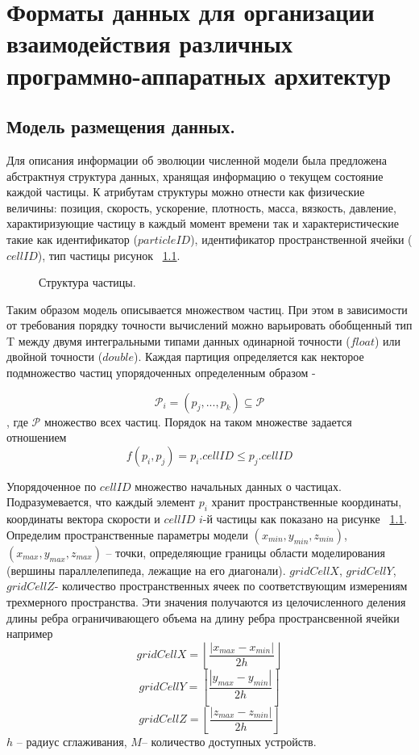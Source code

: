 \chapter{Форматы данных для организации взаимодействия различных программно-аппаратных архитектур}\label{ch:ch3}

\section{Модель размещения данных.}\label{sec:ch3/sect1}

Для описания информации об эволюции численной модели была предложена абстрактнуя структура данных, хранящая информацию о текущем состояние каждой частицы. К атрибутам структуры можно отнести как физические величины: позиция, скорость, ускорение, плотность, масса, вязкость, давление, характиризующие частицу в каждый момент времени так и характеристические такие как идентификатор (\(particleID\)), идентификатор пространственной ячейки (\(cellID\)), тип частицы рисунок ~\ref{fig:p_struct}.
\begin{figure}[ht]
  \caption{Структура частицы.}\label{fig:p_struct}
\end{figure}

Таким образом модель описывается множеством частиц. При этом в зависимости от требования порядку точности вычислений можно варьировать обобщенный тип T между двумя интегральными типами данных одинарной точности (\(float\)) или двойной точности (\(double\)). Каждая партиция определяется как некторое подмножество частиц упорядоченных определенным образом -

\[
  \mathcal{P}_i = (p_{j},...,p_{k}) \subseteq \mathcal{P}
\],
где \(\mathcal{P}\) множество всех частиц. Порядок на таком множестве задается отношением
\[
  f(p_i, p_j) = p_i.cellID \leq p_j.cellID
\]

Упорядоченное по \(cellID\) множество начальных данных о частицах. Подразумевается, что каждый элемент \(p_i\) хранит пространственные координаты, координаты вектора скорости и \(cellID\) \(i\)-й частицы как показано на рисунке ~\ref{fig:p_struct}. Определим пространственные параметры модели
\((x_{min}, y_{min}, z_{min})\), \((x_{max}, y_{max}, z_{max})\) – точки, определяющие границы области моделирования (вершины параллелепипеда, лежащие на его диагонали).
\(gridCellX\), \(gridCellY\), \(gridCellZ\)- количество пространственных ячеек по соответствующим измерениям трехмерного пространства. Эти значения получаются из целочисленного деления длины ребра ограничивающего объема на длину ребра пространсвенной ячейки например
\[
  gridCellX = \left \lfloor \frac{\left |x_{max} - x_{min}  \right |}{2h} \right \rfloor
\]
\[
  gridCellY = \left \lfloor \frac{\left |y_{max} - y_{min}  \right |}{2h} \right \rfloor
\]
\[
  gridCellZ = \left \lfloor \frac{\left |z_{max} - z_{min}  \right |}{2h} \right \rfloor
\]
\(h\) – радиус сглаживания,
\(M\)– количество доступных устройств.

